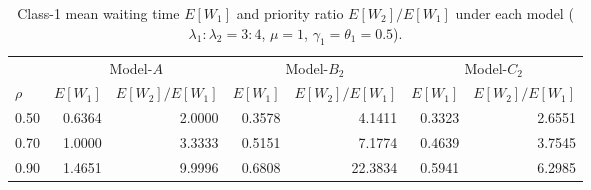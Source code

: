 \begin{table}[t]\centering
\caption{Class-1 mean waiting time $E[W_1]$ and priority ratio $E[W_2]/E[W_1]$ under each model ($\lambda_1{:}\lambda_2=3{:}4$, $\mu=1$, $\gamma_1=\theta_1=0.5$).}
\label{tab:prio:benefit}
\begin{tabular}{lrrrrrr}
\toprule
 & \multicolumn{2}{c}{Model-$A$} & \multicolumn{2}{c}{Model-$B_2$} & \multicolumn{2}{c}{Model-$C_2$} \\
\cmidrule(lr){2-3}\cmidrule(lr){4-5}\cmidrule(lr){6-7}
$\rho$ & $E[W_1]$ & $E[W_2]/E[W_1]$ & $E[W_1]$ & $E[W_2]/E[W_1]$ & $E[W_1]$ & $E[W_2]/E[W_1]$ \\
\midrule
0.50 & 0.6364 & 2.0000 & 0.3578 & 4.1411 & 0.3323 & 2.6551 \\
0.70 & 1.0000 & 3.3333 & 0.5151 & 7.1774 & 0.4639 & 3.7545 \\
0.90 & 1.4651 & 9.9996 & 0.6808 & 22.3834 & 0.5941 & 6.2985 \\
\bottomrule
\end{tabular}
\end{table}

